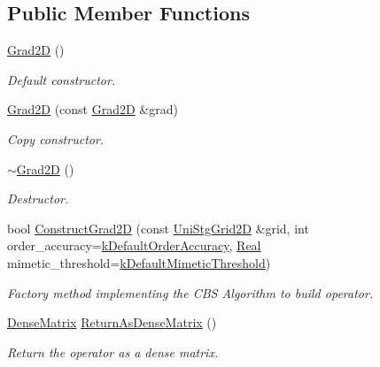 \subsection*{Public Member Functions}
\begin{DoxyCompactItemize}
\item 
\hyperlink{classmtk_1_1Grad2D_a15bdca254b7bf662913b34c7afb8d4c9}{Grad2\+D} ()
\begin{DoxyCompactList}\small\item\em Default constructor. \end{DoxyCompactList}\item 
\hyperlink{classmtk_1_1Grad2D_a31ccf118edb128c85f28b579bd9394a8}{Grad2\+D} (const \hyperlink{classmtk_1_1Grad2D}{Grad2\+D} \&grad)
\begin{DoxyCompactList}\small\item\em Copy constructor. \end{DoxyCompactList}\item 
\hyperlink{classmtk_1_1Grad2D_ae6a071b24422d057c41346e80be96cb3}{$\sim$\+Grad2\+D} ()
\begin{DoxyCompactList}\small\item\em Destructor. \end{DoxyCompactList}\item 
bool \hyperlink{classmtk_1_1Grad2D_a9771be954c59880e3d83f4d645378c00}{Construct\+Grad2\+D} (const \hyperlink{classmtk_1_1UniStgGrid2D}{Uni\+Stg\+Grid2\+D} \&grid, int order\+\_\+accuracy=\hyperlink{group__c01-roots_ga0d95560098eb36420511103637b6952f}{k\+Default\+Order\+Accuracy}, \hyperlink{group__c01-roots_gac080bbbf5cbb5502c9f00405f894857d}{Real} mimetic\+\_\+threshold=\hyperlink{group__c01-roots_ga35718d949bdc81a08a9cc8ebbe3478a2}{k\+Default\+Mimetic\+Threshold})
\begin{DoxyCompactList}\small\item\em Factory method implementing the C\+B\+S Algorithm to build operator. \end{DoxyCompactList}\item 
\hyperlink{classmtk_1_1DenseMatrix}{Dense\+Matrix} \hyperlink{classmtk_1_1Grad2D_afa14fa1b84f05752027c1cef66381de8}{Return\+As\+Dense\+Matrix} ()
\begin{DoxyCompactList}\small\item\em Return the operator as a dense matrix. \end{DoxyCompactList}\end{DoxyCompactItemize}
